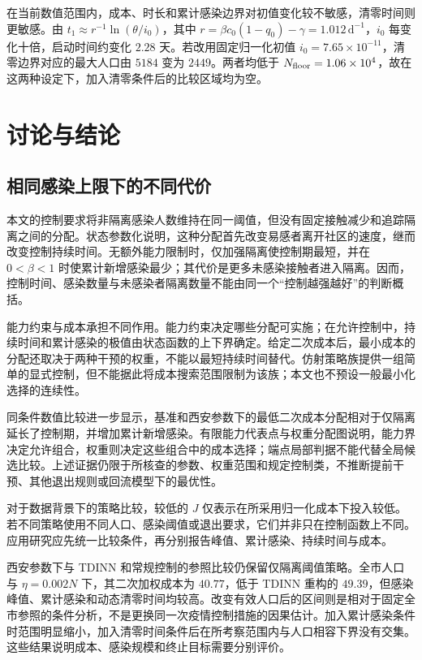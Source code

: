 \documentclass[lang=cn,a4paper,newtx]{elegantpaper}
\numberwithin{equation}{section}
\theoremstyle{plain}
\begin{document}
在当前数值范围内，成本、时长和累计感染边界对初值变化较不敏感，清零时间则更敏感。由 $t_1\approx r^{-1}\ln(\theta/i_0)$，其中 $r=\beta c_0(1-q_0)-\gamma=1.012\,\mathrm{d}^{-1}$，$i_0$ 每变化十倍，启动时间约变化 $2.28$ 天。若改用固定归一化初值 $i_0=7.65\times10^{-11}$，清零边界对应的最大人口由 $5184$ 变为 $2449$。两者均低于 $N_{\rm floor}=1.06\times10^4$，故在这两种设定下，加入清零条件后的比较区域均为空。


\FloatBarrier

\section{讨论与结论}
\label{sec:discussion}
\subsection{相同感染上限下的不同代价}
本文的控制要求将非隔离感染人数维持在同一阈值，但没有固定接触减少和追踪隔离之间的分配。状态参数化说明，这种分配首先改变易感者离开社区的速度，继而改变控制持续时间。无额外能力限制时，仅加强隔离使控制期最短，并在 $0<\beta<1$ 时使累计新增感染最少；其代价是更多未感染接触者进入隔离。因而，控制时间、感染数量与未感染者隔离数量不能由同一个“控制越强越好”的判断概括。

能力约束与成本承担不同作用。能力约束决定哪些分配可实施；在允许控制中，持续时间和累计感染的极值由状态函数的上下界确定。给定二次成本后，最小成本的分配还取决于两种干预的权重，不能以最短持续时间替代。仿射策略族提供一组简单的显式控制，但不能据此将成本搜索范围限制为该族；本文也不预设一般最小化选择的连续性。

同条件数值比较进一步显示，基准和西安参数下的最低二次成本分配相对于仅隔离延长了控制期，并增加累计新增感染。有限能力代表点与权重分配图说明，能力界决定允许组合，权重则决定这些组合中的成本选择；端点局部判据不能代替全局候选比较。上述证据仍限于所核查的参数、权重范围和规定控制类，不推断提前干预、其他退出规则或回流模型下的最优性。

对于数据背景下的策略比较，较低的 $J$ 仅表示在所采用归一化成本下投入较低。若不同策略使用不同人口、感染阈值或退出要求，它们并非只在控制函数上不同。应用研究应先统一比较条件，再分别报告峰值、累计感染、持续时间与成本。

西安参数下与 TDINN 和常规控制的参照比较仍保留仅隔离阈值策略。全市人口与 $\eta=0.002N$ 下，其二次加权成本为 $40.77$，低于 TDINN 重构的 $49.39$，但感染峰值、累计感染和动态清零时间均较高。改变有效人口后的区间则是相对于固定全市参照的条件分析，不是更换同一次疫情控制措施的因果估计。加入累计感染条件时范围明显缩小，加入清零时间条件后在所考察范围内与人口相容下界没有交集。这些结果说明成本、感染规模和终止目标需要分别评价。
\end{document}
